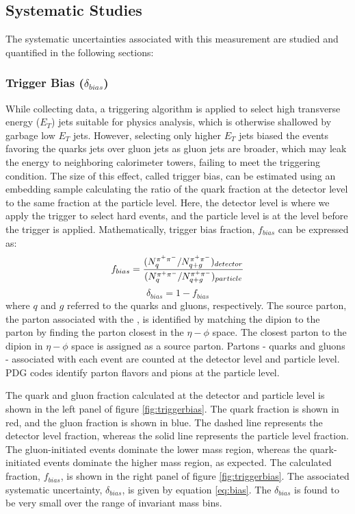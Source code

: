 \subsection{Systematic Studies}
 The systematic uncertainties associated with this measurement are studied and quantified in the following sections:
\subsubsection{Trigger Bias ($\delta_{bias}$)}
While collecting data, a triggering algorithm is applied to select high transverse energy ($E_T$) jets suitable for physics analysis, which is otherwise shallowed by garbage low $E_T$ jets. However, selecting only higher $E_T$ jets biased the events favoring the quarks jets over gluon jets as gluon jets are broader, which may leak the energy to neighboring calorimeter towers, failing to meet the triggering condition. The size of this effect, called trigger bias, can be estimated using an embedding sample calculating the ratio of the quark fraction at the detector level to the same fraction at the particle level. Here, the detector level is where we apply the trigger to select hard \dipion events, and the particle level is at the level before the trigger is applied. Mathematically, trigger bias fraction, $f_{bias}$ can be expressed as:         
\begin{equation}
    \centering
     f_{bias} = \frac{(N^{\pi^+\pi^-}_q/N^{\pi^+\pi^-}_{q+g})_{detector}}{(N^{\pi^+\pi^-}_q/N^{\pi^+\pi^-}_{q+g})_{particle}}
    \label{eq:triggerbias}
\end{equation}
\begin{equation}
    \delta_{bias} = 1-f_{bias}
    \label{eq:bias}
\end{equation}
where $q$ and $g$ referred to the quarks and gluons, respectively.
The source parton, the parton associated with the \dipion, is identified by matching the dipion to the parton by finding the parton closest in the $\eta-\phi$ space. The closest parton to the dipion in $\eta-\phi$ space is assigned as a source parton. Partons - quarks and gluons - associated with each \dipion event are counted at the detector level and particle level. PDG codes identify parton flavors and pions at the particle level.   

The quark and gluon fraction calculated at the detector and particle level is shown in the left panel of figure \ref{fig:triggerbias}. The quark fraction is shown in red, and the gluon fraction is shown in blue. The dashed line represents the detector level fraction, whereas the solid line represents the particle level fraction. The gluon-initiated events dominate the lower mass region, whereas the quark-initiated events dominate the higher mass region, as expected. The calculated fraction, $f_{bias}$, is shown in the right panel of figure \ref{fig:triggerbias}. The associated systematic uncertainty, $\delta_{bias}$, is given by equation \ref{eq:bias}. The $\delta_{bias}$ is found to be very small over the range of invariant mass bins.

